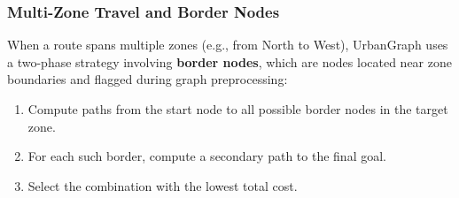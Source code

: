 \documentclass[12pt]{article}
\begin{document}
\subsubsection*{Multi-Zone Travel and Border Nodes}

When a route spans multiple zones (e.g., from North to West), UrbanGraph uses a two-phase strategy involving \textbf{border nodes}, which are nodes located near zone boundaries and flagged during graph preprocessing:
\begin{enumerate}
    \item Compute paths from the start node to all possible border nodes in the target zone.
    \item For each such border, compute a secondary path to the final goal.
    \item Select the combination with the lowest total cost.
\end{enumerate}
\end{document}

